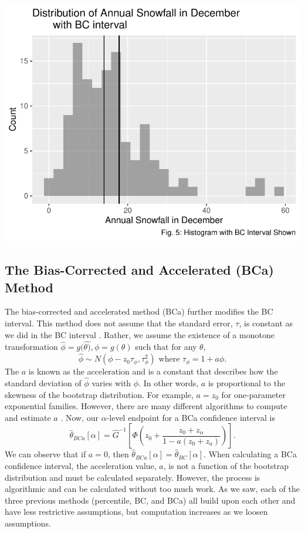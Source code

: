 \documentclass[12pt]{article}
\begin{document}
\includegraphics{paper_files/figure-latex/unnamed-chunk-10-1.pdf}

\hypertarget{the-bias-corrected-and-accelerated-bca-method}{%
\subsection{The Bias-Corrected and Accelerated (BCa)
Method}\label{the-bias-corrected-and-accelerated-bca-method}}

The bias-corrected and accelerated method (BCa) further modifies the BC
interval. This method does not assume that the standard error, \(\tau\),
is constant as we did in the BC interval
\citep[\citet{EfronCasi}]{Efron86}. Rather, we assume the existence of a
monotone transformation
\(\hat{\phi} = g(\hat{\theta)}, \phi = g(\theta)\) such that for any
\(\theta\),
\[\hat{\phi} \sim N(\phi - z_0\tau_\phi, \tau_\phi^2) \text{ where } \tau_\phi = 1+ a\phi.\]
The \(a\) is known as the acceleration and is a constant that describes
how the standard deviation of \(\hat{\phi}\) varies with \(\phi\). In
other words, \(a\) is proportional to the skewness of the bootstrap
distribution. For example, \(a=z_0\) for one-parameter exponential
families. However, there are many different algorithms to compute and
estimate \(a\) \citep{Flowers18}. Now, our \(\alpha\)-level endpoint for
a BCa confidence interval is
\[\hat{\theta}_{BCa}[\alpha] = \hat{G}^{-1} \left [ \Phi \left ( z_0 + \frac{z_0+z_\alpha}{1-a(z_0+z_a)} \right ) \right ].\]
We can observe that if \(a = 0\), then
\(\hat{\theta}_{BCa}[\alpha] = \hat{\theta}_{BC}[\alpha].\) When
calculating a BCa confidence interval, the acceleration value, \(a\), is
not a function of the bootstrap distribution and must be calculated
separately. However, the process is algorithmic and can be calculated
without too much work. As we saw, each of the three previous methods
(percentile, BC, and BCa) all build upon each other and have less
restrictive assumptions, but computation increases as we loosen
assumptions.
\end{document}
